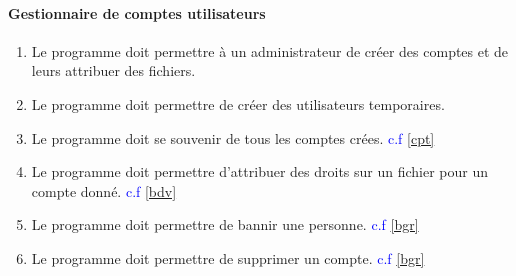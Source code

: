 \documentclass[10pt,a4paper]{report}
\begin{document}
\paragraph{Gestionnaire de comptes utilisateurs}
	\begin{enumerate}
		\item Le programme doit permettre à un administrateur de créer des comptes et de leurs attribuer des fichiers.
		\item Le programme doit permettre de créer des utilisateurs temporaires.
		\item Le programme doit se souvenir de tous les comptes crées.\textcolor{blue}{ c.f \ref{cpt} }
		\item Le programme doit permettre d'attribuer des droits sur un fichier pour un compte donné.\textcolor{blue}{ c.f \ref{bdv}}	
		\item Le programme doit permettre de bannir une personne.\textcolor{blue}{ c.f \ref{bgr}}
		\item Le programme doit permettre de supprimer un compte.\textcolor{blue}{ c.f \ref{bgr}}
	\end{enumerate}
	
\end{document}
